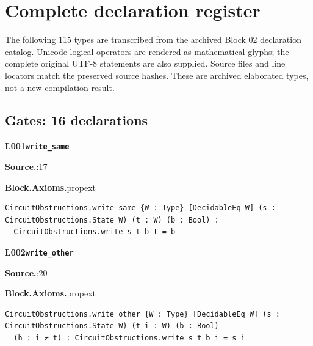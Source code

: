 \clearpage\section*{Complete declaration register}
The following 115 types are transcribed from the archived Block 02 declaration catalog. Unicode logical operators are rendered as mathematical glyphs; the complete original UTF-8 statements are also supplied. Source files and line locators match the preserved source hashes. These are archived elaborated types, not a new compilation result.
\begingroup
{}

\subsection*{Gates: 16 declarations}
\par\medskip\noindent\begin{minipage}{\textwidth}
{\small\bfseries L001\enspace\texttt{write\_same}\par}
{\footnotesize\raggedright\textbf{Source.}\enspace{}:17\par
\textbf{Block.}\quad\textbf{Axioms.}\enspace propext\par}\nopagebreak
\begin{lstlisting}
CircuitObstructions.write_same {W : Type} [DecidableEq W] (s : CircuitObstructions.State W) (t : W) (b : Bool) :
  CircuitObstructions.write s t b t = b
\end{lstlisting}
\end{minipage}\par

\par\medskip\noindent\begin{minipage}{\textwidth}
{\small\bfseries L002\enspace\texttt{write\_other}\par}
{\footnotesize\raggedright\textbf{Source.}\enspace{}:20\par
\textbf{Block.}\quad\textbf{Axioms.}\enspace propext\par}\nopagebreak
\begin{lstlisting}
CircuitObstructions.write_other {W : Type} [DecidableEq W] (s : CircuitObstructions.State W) (t i : W) (b : Bool)
  (h : i ≠ t) : CircuitObstructions.write s t b i = s i
\end{lstlisting}
\end{minipage}\par

